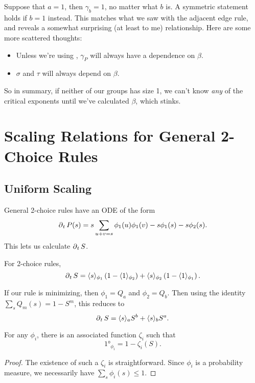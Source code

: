 \documentclass[twoside,10pt]{article}
\begin{document}
Suppose that $a=1$, then $\gamma_b=1$, no matter what $b$ is. A symmetric statement holds if $b=1$ instead. This matches what we saw with the adjacent edge rule, and reveals a somewhat surprising (at least to me) relationship. Here are some more scattered thoughts:
\begin{itemize}
	\item Unless we're using \ER, $\gamma_{P}$ will always have a dependence on $\beta$.
	\item $\sigma$ and $\tau$ will always depend on $\beta$.
\end{itemize}
So in summary, if neither of our groups has size 1, we can't know \textit{any} of the critical exponents until we've calculated $\beta$, which stinks.

\section{Scaling Relations for General 2-Choice Rules}

\subsection{Uniform Scaling}

General 2-choice rules have an ODE of the form
	\[
		\operatorname{\partial}_{t}{P(s)} = s \sum_{u+v=s} \phi_1(u) \phi_1(v) - s \phi_1(s) - s\phi_2(s).
	\] 
This lets us calculate $\operatorname{\partial}_{t}{S} $.
\begin{prop}
	\label{prop:2c-sdelS}
	For 2-choice rules,
	\[
		\operatorname{\partial}_{t}{S} = \langle s \rangle_{\phi_1}\left( 1-\langle 1 \rangle_{\phi_2} \right) + \langle s \rangle_{\phi_2}\left( 1-\langle 1 \rangle_{\phi_1} \right).
	\] 
\end{prop}
\begin{ex}[]
	If our rule is minimizing, then $\phi_1=Q_a$ and $\phi_2=Q_b$. Then using the identity $\sum_s Q_m(s) = 1-S^m$, this reduces to
	\[
		\operatorname{\partial}_{t}{S} = \langle s \rangle_{a}S^{b} + \langle s \rangle_{b}S^{a}.
	\] 
\end{ex}

\begin{lem}[]
For any $\phi_i$, there is an associated function $\zeta_i$ such that
\[
	\ang{1}_{\phi_i} = 1 - \zeta_i(S).
\] 
\end{lem}
\begin{proof}

	 The existence of such a $\zeta_i$ is straightforward. Since $\phi_i$ is a probability measure, we necessarily have $\sum_s \phi_i(s) \leq 1$. 
\end{proof}
\end{document}
